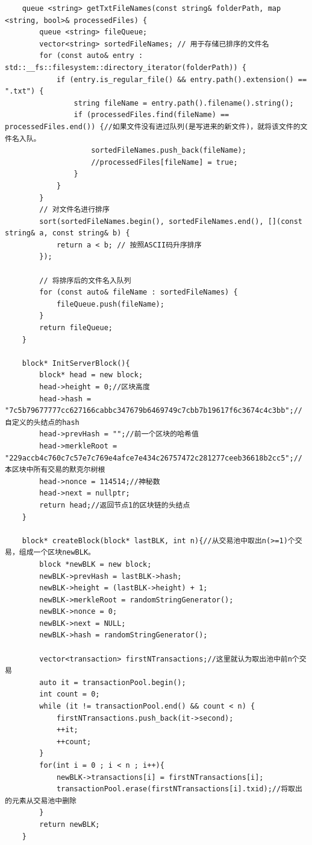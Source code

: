 \documentclass[10pt,a4paper]{article}
\begin{document}
\begin{verbatim}
    queue <string> getTxtFileNames(const string& folderPath, map <string, bool>& processedFiles) {
        queue <string> fileQueue;
        vector<string> sortedFileNames; // 用于存储已排序的文件名
        for (const auto& entry : std::__fs::filesystem::directory_iterator(folderPath)) {
            if (entry.is_regular_file() && entry.path().extension() == ".txt") {
                string fileName = entry.path().filename().string();
                if (processedFiles.find(fileName) == processedFiles.end()) {//如果文件没有进过队列(是写进来的新文件)，就将该文件的文件名入队。
                    sortedFileNames.push_back(fileName);
                    //processedFiles[fileName] = true;
                }
            }
        }
        // 对文件名进行排序
        sort(sortedFileNames.begin(), sortedFileNames.end(), [](const string& a, const string& b) {
            return a < b; // 按照ASCII码升序排序
        });
    
        // 将排序后的文件名入队列
        for (const auto& fileName : sortedFileNames) {
            fileQueue.push(fileName);
        }
        return fileQueue;
    }
    
    block* InitServerBlock(){
        block* head = new block;
        head->height = 0;//区块高度
        head->hash = "7c5b79677777cc627166cabbc347679b6469749c7cbb7b19617f6c3674c4c3bb";//自定义的头结点的hash
        head->prevHash = "";//前一个区块的哈希值
        head->merkleRoot = "229accb4c760c7c57e7c769e4afce7e434c26757472c281277ceeb36618b2cc5";//本区块中所有交易的默克尔树根
        head->nonce = 114514;//神秘数
        head->next = nullptr;
        return head;//返回节点1的区块链的头结点
    }
    
    block* createBlock(block* lastBLK, int n){//从交易池中取出n(>=1)个交易，组成一个区块newBLK。
        block *newBLK = new block;
        newBLK->prevHash = lastBLK->hash;
        newBLK->height = (lastBLK->height) + 1;
        newBLK->merkleRoot = randomStringGenerator();
        newBLK->nonce = 0;
        newBLK->next = NULL;
        newBLK->hash = randomStringGenerator();
    
        vector<transaction> firstNTransactions;//这里就认为取出池中前n个交易
        auto it = transactionPool.begin();
        int count = 0;
        while (it != transactionPool.end() && count < n) {
            firstNTransactions.push_back(it->second);
            ++it;
            ++count;
        }
        for(int i = 0 ; i < n ; i++){
            newBLK->transactions[i] = firstNTransactions[i];
            transactionPool.erase(firstNTransactions[i].txid);//将取出的元素从交易池中删除
        }
        return newBLK;
    }
    

\end{verbatim}
\end{document}
